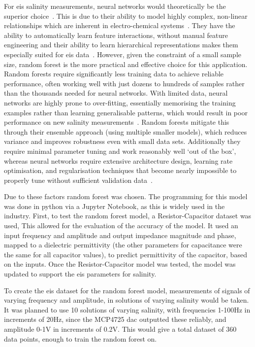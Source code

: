 For \gls{eis} salinity measurements, neural networks would theoretically be the superior choice~\cite{doonyapisut_analysis_2023}.
This is due to their ability to model highly complex, non-linear relationships which are inherent in electro-chemical systems~\cite{chen_intelligent_2025}.
They have the ability to automatically learn feature interactions, without manual feature engineering and their ability to learn hierarchical representations makes them especially suited for \gls{eis} data~\cite{doonyapisut_analysis_2023}.
However, given the constraint of a small sample size, random forest is the more practical and effective choice for this application.
Random forests require significantly less training data to achieve reliable performance, often working well with just dozens to hundreds of samples rather than the thousands needed for neural networks.
With limited data, neural networks are highly prone to over-fitting, essentially memorising the training examples rather than learning generalisable patterns, which would result in poor performance on new salinity measurements~\cite{alwosheel_is_2018}.
Random forests mitigate this through their ensemble approach (using multiple smaller models), which reduces variance and improves robustness even with small data sets. 
Additionally they require minimal parameter tuning and work reasonably well `out of the box', whereas neural networks require extensive architecture design, learning rate optimisation, and regularisation techniques that become nearly impossible to properly tune without sufficient validation data~\cite{alwosheel_is_2018}.

Due to these factors random forest was chosen.
The programming for this model was done in python via a Jupyter Notebook, as this is widely used in the industry.
First, to test the random forest model, a Resistor-Capacitor dataset was used,
This allowed for the evaluation of the accuracy of the model.
It used an input frequency and amplitude and output impedance magnitude and phase, mapped to a dielectric permittivity (the other parameters for capacitance were the same for all capacitor values), to predict permittivity of the capacitor, based on the inputs.
Once the Resistor-Capacitor model was tested, the model was updated to support the \gls{eis} parameters for salinity.

To create the \gls{eis} dataset for the random forest model, measurements of signals of varying frequency and amplitude, in solutions of varying salinity would be taken.
It was planned to use 10 solutions of varying salinity, with frequencies 1-100Hz in increments of 20Hz, since the MCP4725 \gls{dac} outputted these reliably, and amplitude 0-1V in increments of 0.2V.
This would give a total dataset of 360 data points, enough to train the random forest on.